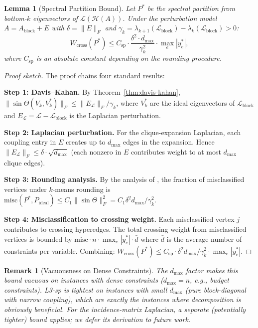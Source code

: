 \documentclass[12pt]{article}
\newtheorem{lemma}[theorem]{Lemma}
\newtheorem{remark}[theorem]{Remark}
\begin{document}
\begin{lemma}[Spectral Partition Bound]
\label{lem:L3sp}
Let $P^*$ be the spectral partition from bottom-$k$ eigenvectors of
$\mathcal{L}(\mathcal{H}(A))$.  Under the perturbation model
$A = A_{\mathrm{block}} + E$ with $\delta = \|E\|_F$ and
$\gamma_k = \lambda_{k+1}(\mathcal{L}_{\mathrm{block}}) - \lambda_k(\mathcal{L}_{\mathrm{block}}) > 0$:
\begin{equation}\label{eq:L3sp}
  W_{\mathrm{cross}}(P^*) \leq C_{\mathrm{sp}} \cdot
  \frac{\delta^2 \cdot d_{\max}}{\gamma_k^2} \cdot \max_{e} |y_e^*|,
\end{equation}
where $C_{\mathrm{sp}}$ is an absolute constant depending on the rounding procedure.
\end{lemma}

\begin{proof}[Proof sketch]
The proof chains four standard results:

\textbf{Step 1: Davis--Kahan.}
By Theorem~\ref{thm:davis-kahan}, $\|\sin\Theta(V_k, V_k^*)\|_F \leq \|E_{\mathcal{L}}\|_F / \gamma_k$,
where $V_k^*$ are the ideal eigenvectors of $\mathcal{L}_{\mathrm{block}}$
and $E_{\mathcal{L}} = \mathcal{L} - \mathcal{L}_{\mathrm{block}}$ is the
Laplacian perturbation.

\textbf{Step 2: Laplacian perturbation.}
For the clique-expansion Laplacian, each coupling entry in $E$ creates up to
$d_{\max}$ edges in the expansion.  Hence
$\|E_{\mathcal{L}}\|_F \leq \delta \cdot \sqrt{d_{\max}}$
(each nonzero in $E$ contributes weight to at most $d_{\max}$ clique edges).

\textbf{Step 3: Rounding analysis.}
By the analysis of \citet{lei2015consistency}, the fraction of misclassified
vertices under $k$-means rounding is
$\mathrm{misc}(P^*, P_{\mathrm{ideal}}) \leq C_1 \|\sin\Theta\|_F^2 = C_1 \delta^2 d_{\max} / \gamma_k^2$.

\textbf{Step 4: Misclassification to crossing weight.}
Each misclassified vertex $j$ contributes to crossing hyperedges.  The total
crossing weight from misclassified vertices is bounded by
$\mathrm{misc} \cdot n \cdot \max_e |y_e^*| \cdot \bar{d}$ where $\bar{d}$
is the average number of constraints per variable.  Combining:
$W_{\mathrm{cross}}(P^*) \leq C_{\mathrm{sp}} \cdot \delta^2 d_{\max} / \gamma_k^2 \cdot \max_e |y_e^*|$.
\end{proof}

\begin{remark}[Vacuousness on Dense Constraints]
The $d_{\max}$ factor makes this bound vacuous on instances with dense
constraints ($d_{\max} = n$, e.g., budget constraints).  L3-sp is tightest
on instances with small $d_{\max}$ (pure block-diagonal with narrow coupling),
which are exactly the instances where decomposition is obviously beneficial.
For the incidence-matrix Laplacian, a separate (potentially tighter) bound
applies; we defer its derivation to future work.
\end{remark}
\end{document}
